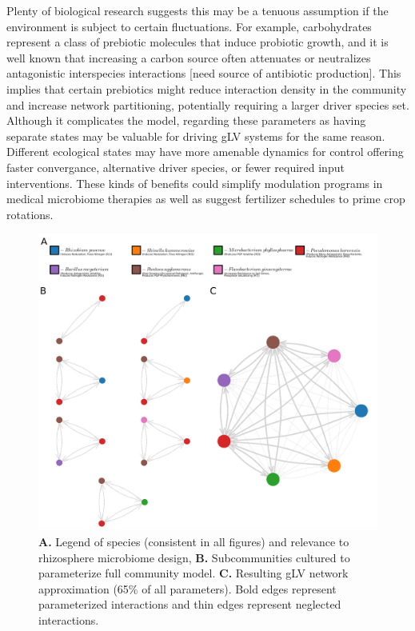 \documentclass[twocolumn, 10pt]{report}
\begin{document}
{Plenty of biological research suggests this may be a tenuous assumption if the environment is subject to certain fluctuations. For example, carbohydrates represent a class of prebiotic molecules that induce probiotic growth, and it is well known that increasing a carbon source often attenuates or neutralizes antagonistic interspecies interactions [need source of antibiotic production]. This implies that certain prebiotics might reduce interaction density in the community and increase network partitioning, potentially requiring a larger driver species set. Although it complicates the model, regarding these parameters as having separate states may be valuable for driving gLV systems for the same reason. Different ecological states may have more amenable dynamics for control offering faster convergance, alternative driver species, or fewer required input interventions. These kinds of benefits could simplify modulation programs in medical microbiome therapies as well as suggest fertilizer schedules to prime crop rotations.

\begin{figure}[!ht]
    \centering
    \includegraphics[width=2.0\columnwidth]{figs/Intro_Figure.png}
    \centering
    \caption{\textbf{A.} Legend of species (consistent in all figures) and relevance to rhizosphere microbiome design, \textbf{B.} Subcommunities cultured to parameterize full community model. \textbf{C.} Resulting gLV network approximation (65\% of all parameters). Bold edges represent parameterized interactions and thin edges represent neglected interactions.}\label{fig:intro}
\end{figure}

}
\end{document}
